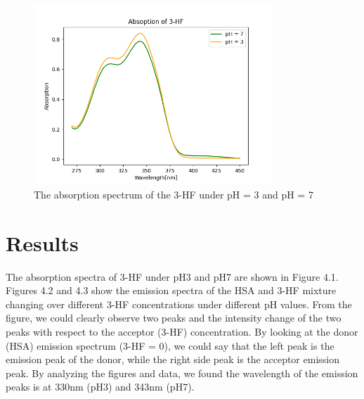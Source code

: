 \documentclass[a4paper,english,12pt,bibliography=totoc]{scrreprt}
\begin{document}
\begin{figure}[h]
    \centering
    \includegraphics[width = 0.8\textwidth]{Figures/Absorption_3_HF.png}
    \caption{The absorption spectrum of the 3-HF under pH = 3 and pH = 7}
    \label{fig:enter-label}
\end{figure}
\section{Results}

The absorption spectra of 3-HF under pH3 and pH7 are shown in Figure 4.1. \\

Figures 4.2 and 4.3 show the emission spectra of the HSA and 3-HF mixture changing over different 3-HF concentrations under different pH values. From the figure, we could clearly observe two peaks and the intensity change of the two peaks with respect to the acceptor (3-HF) concentration. By looking at the donor (HSA) emission spectrum (3-HF = 0), we could say that the left peak is the emission peak of the donor, while the right side peak is the acceptor emission peak. By analyzing the figures and data, we found the wavelength of the emission peaks is at 330nm (pH3) and 343nm (pH7).\\
\end{document}
